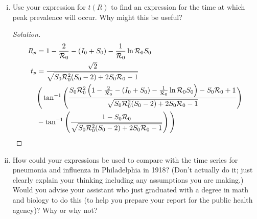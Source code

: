 \documentclass[12pt]{article}
\begin{document}
\begin{enumerate}[(a)]
\begin{enumerate}[(i)]
{\begin{proof}[Solution]
{}
\end{proof}
}

\item Use your expression for $t(R)$ to find an expression for the time at which peak prevalence will occur.  Why might this be useful?

{\color{blue}
\begin{proof}[Solution]
{\color{magenta}

\begin{align}
		R_p &= 1- \frac{2}{{\cal R}_0} - (I_0+S_0) - \frac{1}{{\cal R}_0} \ln{{\cal R}_0 S_0}  \\
		t_p &= \frac{\sqrt{2}}{\sqrt{S_0{\cal R}_0^2(S_0-2)+2S_0{\cal R}_0 -1}} \nonumber \\
		&  \Bigg ( \tan ^{-1} \Bigg ( \frac{S_0{\cal R}_0^2 \left ( 1- \frac{2}{{\cal R}_0} - (I_0+S_0) - \frac{1}{{\cal R}_0} \ln{{\cal R}_0 S_0}  \right ) - S_0{\cal R}_0 +1}{\sqrt{S_0{\cal R}_0^2(S_0-2)+2S_0{\cal R}_0 -1}} \Bigg ) \nonumber \\
		&-\tan ^{-1} \left ( \frac{1 - S_0{\cal R}_0 }{\sqrt{S_0{\cal R}_0^2(S_0-2)+2S_0{\cal R}_0 -1}} \right )  \Bigg ) 
	\end{align}

}
\end{proof}
}

\item How could your expressions be used to compare with the time series for pneumonia and influenza in Philadelphia in 1918?  (Don't actually do it; just clearly explain your thinking including any assumptions you are making.)  Would you advise your assistant who just graduated with a degree in math and biology to do this (to help you prepare your report for the public health agency)?  Why or why not?


\end{enumerate}
\end{enumerate}
\end{document}
